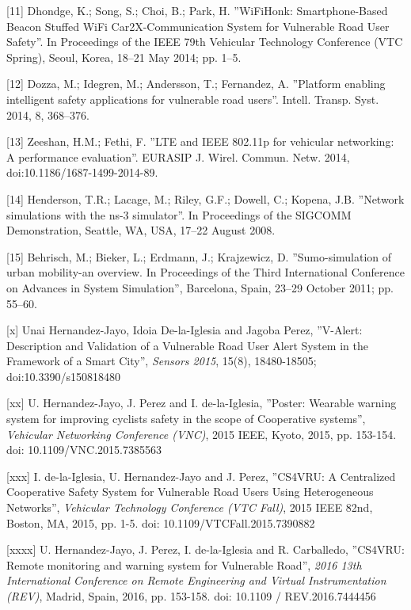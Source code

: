 [11] Dhondge, K.; Song, S.; Choi, B.; Park, H. ''WiFiHonk: Smartphone-Based Beacon Stuffed WiFi Car2X-Communication System for Vulnerable Road User Safety''. In Proceedings of the IEEE 79th Vehicular Technology Conference (VTC Spring), Seoul, Korea, 18–21 May 2014; pp. 1–5.

[12] Dozza, M.; Idegren, M.; Andersson, T.; Fernandez, A. ''Platform enabling intelligent safety applications for vulnerable road users''. Intell. Transp. Syst. 2014, 8, 368–376.

[13] Zeeshan, H.M.; Fethi, F. ''LTE and IEEE 802.11p for vehicular networking: A performance evaluation''. EURASIP J. Wirel. Commun. Netw. 2014, doi:10.1186/1687-1499-2014-89.

[14] Henderson, T.R.; Lacage, M.; Riley, G.F.; Dowell, C.; Kopena, J.B. ''Network simulations with the ns-3 simulator''. In Proceedings of the SIGCOMM Demonstration, Seattle, WA, USA, 17–22 August 2008.

[15] Behrisch, M.; Bieker, L.; Erdmann, J.; Krajzewicz, D. ''Sumo-simulation of urban mobility-an overview. In Proceedings of the Third International Conference on Advances in System Simulation'', Barcelona, Spain, 23–29 October 2011; pp. 55–60.

[x] Unai Hernandez-Jayo, Idoia De-la-Iglesia and Jagoba Perez, ''V-Alert: Description and Validation of a Vulnerable Road User Alert System in the Framework of a Smart City'', \emph{Sensors 2015}, 15(8), 18480-18505; doi:10.3390/s150818480

[xx] U. Hernandez-Jayo, J. Perez and I. de-la-Iglesia, ''Poster: Wearable warning system for improving cyclists safety in the scope of Cooperative systems'', \emph{Vehicular Networking Conference (VNC)}, 2015 IEEE, Kyoto, 2015, pp. 153-154.
doi: 10.1109/VNC.2015.7385563

[xxx] I. de-la-Iglesia, U. Hernandez-Jayo and J. Perez, ''CS4VRU: A Centralized Cooperative Safety System for Vulnerable Road Users Using Heterogeneous Networks'', \emph{Vehicular Technology Conference (VTC Fall)}, 2015 IEEE 82nd, Boston, MA, 2015, pp. 1-5. doi: 10.1109/VTCFall.2015.7390882

[xxxx] U. Hernandez-Jayo, J. Perez, I. de-la-Iglesia and R. Carballedo, ''CS4VRU: Remote monitoring and warning system for Vulnerable Road'', \emph{2016 13th International Conference on Remote Engineering and Virtual Instrumentation (REV)}, Madrid, Spain, 2016, pp. 153-158. doi: 10.1109 / REV.2016.7444456